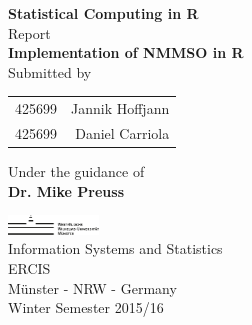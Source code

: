 \begin{titlepage}

\begin{center}

\textup{\small {\bf Statistical Computing in R} \\ Report}\\[0.2in]

\Large \textbf {Implementation of NMMSO in R}\\[0.5in]

\normalsize Submitted by \\
\begin{table}[h]
\centering
\begin{tabular}{lr}
425699 & Jannik Hoffjann \\
425699 & Daniel Carriola \\ 
\end{tabular}
\end{table}

\vspace{.1in}
Under the guidance of\\
{\textbf{Dr. Mike Preuss}}\\[0.2in]

\vfill

\includegraphics[width=0.18\textwidth]{./assets/wwu-logo}\\[0.1in]
\Large{Information Systems and Statistics}\\
\normalsize
\textsc{ERCIS}\\
Münster - NRW - Germany \\
\vspace{0.2cm}
Winter Semester 2015/16

\end{center}

\end{titlepage}